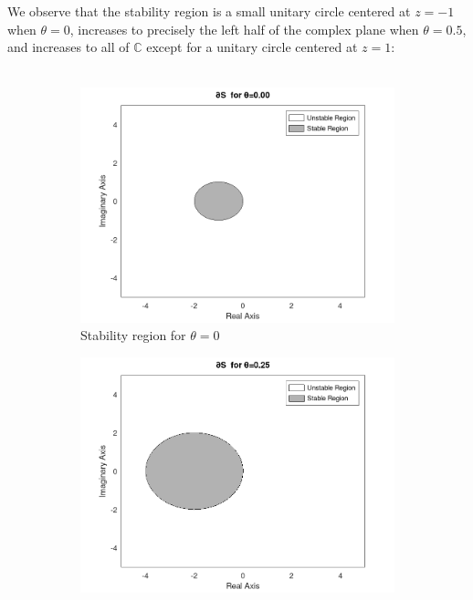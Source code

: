 \begin{solution}\ \\\\
    We observe that the stability region is a small unitary circle centered at $z = -1$ when $\theta = 0$, increases to 
    precisely the left half of the complex plane when $\theta = 0.5$, and increases to all of $\mathbb{C}$ except for a 
    unitary circle centered at $z = 1$: \ \\\\

    \begin{figure}[h]
        \centering
        \begin{subfigure}{0.45\textwidth}
            \includegraphics*[width=\textwidth]{problem_4b_t_0.00.png}
            \caption{Stability region for $\theta = 0$}
        \end{subfigure}
        \hfill
        \begin{subfigure}{0.45\textwidth}
            \includegraphics*[width=\textwidth]{problem_4b_t_0.25.png}

\end{subfigure}
\end{figure}
\end{solution}
